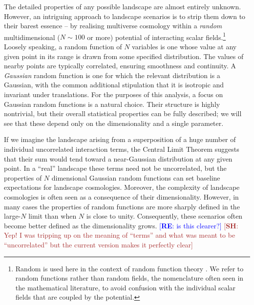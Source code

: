 \documentclass[12pt]{article}
\newcommand{\re}[1]{\textcolor{blue}{[{\bf RE}: #1]}}
\newcommand{\SH}[1]{\textcolor{brown}{[{\bf SH}: #1]}}
\begin{document}
The detailed properties of any possible landscape are almost entirely unknown.  However, an intriguing approach to landscape scenarios is to strip them down to their barest essence -- by realising multiverse cosmology within a {\em random\/} multidimensional ($N\sim100$ or more) potential of interacting scalar fields.\footnote{Random is used here in the  context of random function theory \cite{GRF1, GRF2, GRF3}.  We refer to random functions rather than random fields, the nomenclature often seen in the mathematical literature, to avoid confusion with the individual scalar fields that are coupled by the potential.} Loosely speaking, a random function of $N$ variables is one whose value at any given point in its range is drawn from some specified distribution. The values of nearby points are typically correlated, ensuring smoothness and continuity. A {\em Gaussian\/} random function is one for which the relevant distribution is a Gaussian, with the common additional stipulation that it is isotropic and invariant under translations. For the purposes of this analysis, a focus on Gaussian random functions is a natural choice. Their structure is highly nontrivial, but their overall statistical properties can be fully described; we will see that these depend only on the dimensionality and a single parameter. 

If we imagine the landscape arising from a superposition of a huge number of individual uncorrelated interaction terms, the Central Limit Theorem suggests that their sum would tend toward a near-Gaussian distribution at any given point. In a ``real'' landscape these terms need not be uncorrelated, but the properties of $N$ dimensional Gaussian random functions can set baseline expectations for landscape cosmologies.  Moreover, the complexity of landscape cosmologies is often seen as a consequence of their dimensionality. However, in many cases the properties of random functions are more sharply defined in the large-$N$ limit than when $N$ is close to unity. Consequently, these scenarios often become better defined as the dimensionality grows.   \re{is this clearer?} \SH{Yep! I was tripping up on the meaning of ``terms'' and what was meant to be ``uncorrelated'' but the current version makes it perfectly clear}
 
\end{document}
